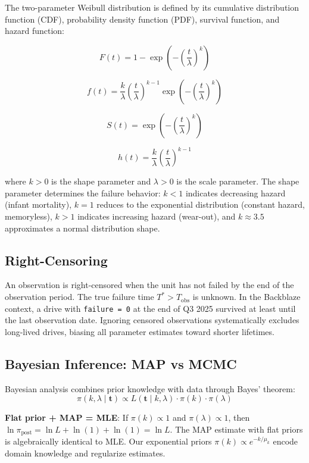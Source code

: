 \documentclass[
]{article}
\begin{document}
The two-parameter Weibull distribution is defined by its cumulative
distribution function (CDF), probability density function (PDF),
survival function, and hazard function:

\[F(t) = 1 - \exp\left(-\left(\frac{t}{\lambda}\right)^k\right)\]

\[f(t) = \frac{k}{\lambda}\left(\frac{t}{\lambda}\right)^{k-1}\exp\left(-\left(\frac{t}{\lambda}\right)^k\right)\]

\[S(t) = \exp\left(-\left(\frac{t}{\lambda}\right)^k\right)\]

\[h(t) = \frac{k}{\lambda}\left(\frac{t}{\lambda}\right)^{k-1}\]

where \(k > 0\) is the shape parameter and \(\lambda > 0\) is the scale
parameter. The shape parameter determines the failure behavior:
\(k < 1\) indicates decreasing hazard (infant mortality), \(k = 1\)
reduces to the exponential distribution (constant hazard, memoryless),
\(k > 1\) indicates increasing hazard (wear-out), and \(k \approx 3.5\)
approximates a normal distribution shape.

\subsection{Right-Censoring}\label{right-censoring}

An observation is right-censored when the unit has not failed by the end
of the observation period. The true failure time
\(T^* > T_{\text{obs}}\) is unknown. In the Backblaze context, a drive
with \texttt{failure\ =\ 0} at the end of Q3 2025 survived at least
until the last observation date. Ignoring censored observations
systematically excludes long-lived drives, biasing all parameter
estimates toward shorter lifetimes.

\subsection{Bayesian Inference: MAP vs
MCMC}\label{bayesian-inference-map-vs-mcmc}

Bayesian analysis combines prior knowledge with data through Bayes'
theorem:
\[\pi(k, \lambda \mid \mathbf{t}) \propto L(\mathbf{t} \mid k, \lambda) \cdot \pi(k) \cdot \pi(\lambda)\]

\textbf{Flat prior + MAP = MLE}: If \(\pi(k) \propto 1\) and
\(\pi(\lambda) \propto 1\), then
\(\ln \pi_{\text{post}} = \ln L + \ln(1) + \ln(1) = \ln L\). The MAP
estimate with flat priors is algebraically identical to MLE. Our
exponential priors \(\pi(k) \propto e^{-k/\mu_k}\) encode domain
knowledge and regularize estimates.
\end{document}
